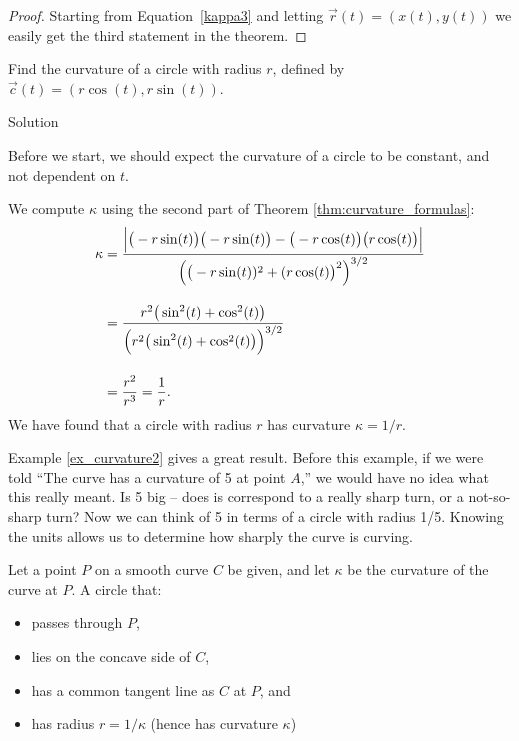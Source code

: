 \begin{proof}
Starting from Equation~\eqref{kappa3} and letting $\vec r(t) = \left( x(t), y(t)\right)$ we easily get the third statement in the theorem. 
\end{proof}

\fi

\begin{example}\label{ex_curvature2}
Find the curvature of a circle with radius $r$, defined by $\vec c(t) = \left( r\cos(t),r\sin(t)\right)$.

Solution 

Before we start, we should expect the curvature of a circle to be constant, and not dependent on $t$. 

We compute $\kappa$ using the second part of Theorem \ref{thm:curvature_formulas}:
\begin{align*}
\kappa &= \frac{\Big|\big(-r\sin(t)\big)\big(-r\sin(t)\big) - \big(-r\cos(t)\big)\big(r\cos(t)\big)\Big|}{\Big( \big(-r\sin (t))^2+(r\cos(t)\big)^2\Big)^{3/2}} \\[0.2cm]
			&= \rule{0pt}{20pt}\frac{r^2\big(\sin^2(t)+\cos^2(t)\big)}{\Big(r^2\big(\sin^2(t)+\cos^2(t)\big)\Big)^{3/2}}\\[0.2cm]
			&= \rule{0pt}{20pt}\frac{r^2}{r^3} = \frac1r.
\end{align*}
We have found that a circle with radius $r$ has curvature $\kappa = 1/r$.
\end{example}

Example \ref{ex_curvature2} gives a great result. Before this example, if we were told ``The curve has a curvature of 5 at point $A$,'' we would have no idea what this really meant. Is 5 big -- does is correspond to a really sharp turn, or a not-so-sharp turn? Now we can think of 5 in terms of a circle with radius 1/5. Knowing the units  allows us to determine how sharply the curve is curving.


Let a point $P$ on a smooth curve $C$  be given, and let $\kappa$ be the curvature of the curve at $P$. A circle that:
	\begin{itemize}
		\item passes through $P$,
		\item	lies on the concave side of $C$,
		\item	has a common tangent line as $C$ at $P$, and
		\item	has radius $r=1/\kappa$ (hence has curvature $\kappa$)
	\end{itemize}
	
